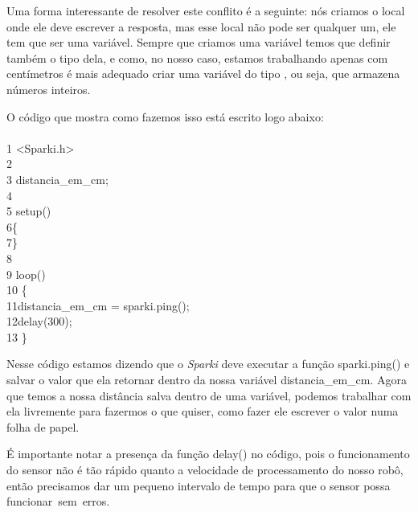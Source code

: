 \documentclass[conference]{IEEEtran}
\begin{document}
    \par
    Uma forma interessante de resolver este conflito é a seguinte: nós criamos o local onde ele deve escrever a resposta, mas esse local não pode ser qualquer um, ele tem que ser uma variável. Sempre que criamos uma variável temos que definir também o tipo dela, e como, no nosso caso, estamos trabalhando apenas com centímetros é mais adequado criar uma variável do tipo {}, ou seja, que armazena números inteiros.
    \par
    O código que mostra como fazemos isso está escrito logo abaixo:
    \\
    \\
    {\selectfont 
    {\color{cinza}1} <Sparki.h>\\
    {\color{cinza}2}\quad\\
    {\color{cinza}3} distancia\_em\_cm;}\\
    {\color{cinza}4}\quad\\
    {\color{cinza}5} setup()\\
    {\color{cinza}6}\quad\{\\
    {\color{cinza}7}\quad\}\\
    {\color{cinza}8}\quad\\
    {\color{cinza}9} loop()\\
    {\color{cinza}10}  \{\\
    {\color{cinza}11}\quad\quad distancia\_em\_cm = sparki.ping();\\
    {\color{cinza}12}\quad\quad delay(300);\\
    {\color{cinza}13}  \}\\
    \par
    Nesse código estamos dizendo que o \textit{Sparki} deve executar a função { \selectfont sparki.ping()} e salvar o valor que ela retornar dentro da nossa variável { \selectfont distancia\_em\_cm}. Agora que temos a nossa distância salva dentro de uma variável, podemos trabalhar com ela livremente para fazermos o que quiser, como fazer ele escrever o valor numa folha de papel.
    \par
    É importante notar a presença da função { \selectfont  delay()} no código, pois o funcionamento do sensor não é tão rápido quanto a velocidade de processamento do nosso robô, então precisamos dar um pequeno intervalo de tempo para que o sensor possa funcionar sem erros.
\end{document}
